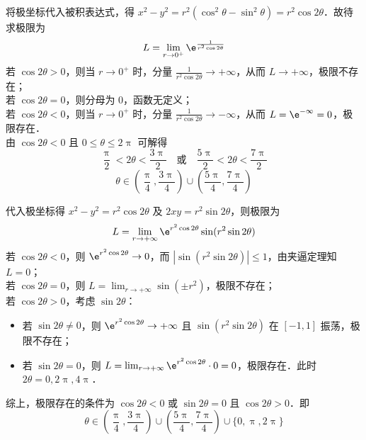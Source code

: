 \begin{solution}

    将极坐标代入被积表达式，得 $x^2 - y^2 = r^2(\cos^2 \theta - \sin^2 \theta) = r^2 \cos 2\theta$．故待求极限为
    \begin{equation}
        L = \lim_{r \to 0^+} \e^{\frac{1}{r^2 \cos 2\theta}}
    \end{equation}
    若 $\cos 2\theta > 0$，则当 $r \to 0^+$ 时，分量 $\frac{1}{r^2 \cos 2\theta} \to +\infty$，从而 $L \to +\infty$，极限不存在；\\
    若 $\cos 2\theta = 0$，则分母为 $0$，函数无定义；\\
    若 $\cos 2\theta < 0$，则当 $r \to 0^+$ 时，分量 $\frac{1}{r^2 \cos 2\theta} \to -\infty$，从而 $L = \e^{-\infty} = 0$，极限存在．\\
    由 $\cos 2\theta < 0$ 且 $0 \leqslant \theta \leqslant 2\uppi$ 可解得
    \begin{equation}
        \frac{\uppi}{2} < 2\theta < \frac{3\uppi}{2} \quad \text{或} \quad \frac{5\uppi}{2} < 2\theta < \frac{7\uppi}{2}
    \end{equation}
    \begin{equation}
        \boxed{\theta \in \left( \frac{\uppi}{4}, \frac{3\uppi}{4} \right) \cup \left( \frac{5\uppi}{4}, \frac{7\uppi}{4} \right)}
    \end{equation}


    代入极坐标得 $x^2 - y^2 = r^2 \cos 2\theta$ 及 $2xy = r^2 \sin 2\theta$，则极限为
    \begin{equation}
        L = \lim_{r \to +\infty} \e^{r^2 \cos 2\theta} \sin(r^2 \sin 2\theta)
    \end{equation}
    若 $\cos 2\theta < 0$，则 $\e^{r^2 \cos 2\theta} \to 0$，而 $|\sin(r^2 \sin 2\theta)| \leqslant 1$，由夹逼定理知 $L = 0$；\\
    若 $\cos 2\theta = 0$，则 $L = \lim_{r \to +\infty} \sin(\pm r^2)$，极限不存在；\\
    若 $\cos 2\theta > 0$，考虑 $\sin 2\theta$：
    \begin{itemize}
        \item 若 $\sin 2\theta \neq 0$，则 $\e^{r^2 \cos 2\theta} \to +\infty$ 且 $\sin(r^2 \sin 2\theta)$ 在 $[-1, 1]$ 振荡，极限不存在；
        \item 若 $\sin 2\theta = 0$，则 $L = \lim_{r \to +\infty} \e^{r^2 \cos 2\theta} \cdot 0 = 0$，极限存在．此时 $2\theta = 0, 2\uppi, 4\uppi$．
    \end{itemize}
    综上，极限存在的条件为 $\cos 2\theta < 0$ 或 $\sin 2\theta = 0$ 且 $\cos 2\theta > 0$．即
    \begin{equation}
        \boxed{\theta \in \left( \frac{\uppi}{4}, \frac{3\uppi}{4} \right) \cup \left( \frac{5\uppi}{4}, \frac{7\uppi}{4} \right) \cup \{0, \uppi, 2\uppi\}}
    \end{equation}
\end{solution}


